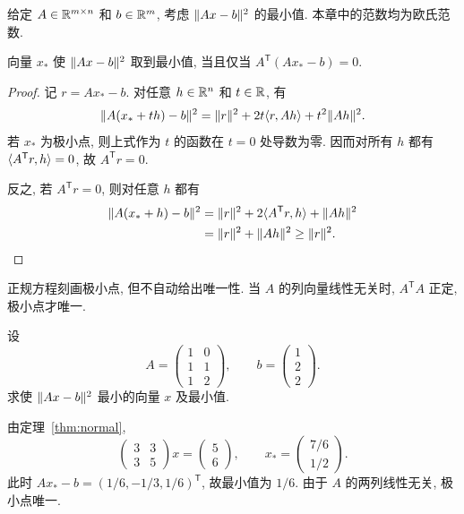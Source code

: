 给定 $A\in\mathbb R^{m\times n}$ 和 $b\in\mathbb R^m$, 考虑 $\lVert Ax-b\rVert^{2}$ 的最小值.
本章中的范数均为欧氏范数.
\begin{theorem}\label{thm:normal}
向量 $x_*$ 使 $\lVert Ax-b\rVert^{2}$ 取到最小值, 当且仅当
$A^{\mathsf T}(Ax_*-b)=0$.
\end{theorem}
\begin{proof}
记 $r=Ax_*-b$. 对任意 $h\in\mathbb R^n$ 和 $t\in\mathbb R$, 有
\[
\lVert A(x_*+th)-b\rVert^{2}
=\lVert r\rVert^{2}+2t\langle r,Ah\rangle+t^{2}\lVert Ah\rVert^{2}.
\]
若 $x_*$ 为极小点, 则上式作为 $t$ 的函数在 $t=0$ 处导数为零.
因而对所有 $h$ 都有 $\langle A^{\mathsf T}r,h\rangle=0$, 故 $A^{\mathsf T}r=0$.

反之, 若 $A^{\mathsf T}r=0$, 则对任意 $h$ 都有
\begin{align*}
\lVert A(x_*+h)-b\rVert^{2}
 &=\lVert r\rVert^{2}+2\langle A^{\mathsf T}r,h\rangle+\lVert Ah\rVert^{2}\\
 &=\lVert r\rVert^{2}+\lVert Ah\rVert^{2}\ge\lVert r\rVert^{2}.\qedhere
\end{align*}
\end{proof}
\begin{remark}
正规方程刻画极小点, 但不自动给出唯一性. 当 $A$ 的列向量线性无关时,
$A^{\mathsf T}A$ 正定, 极小点才唯一.
\end{remark}
\begin{example}
设
\[
A=\begin{pmatrix}1&0\\1&1\\1&2\end{pmatrix},\qquad
b=\begin{pmatrix}1\\2\\2\end{pmatrix}.
\]
求使 $\lVert Ax-b\rVert^{2}$ 最小的向量 $x$ 及最小值.
\end{example}
\begin{solution}
由定理~\ref{thm:normal},
\[
\begin{pmatrix}3&3\\3&5\end{pmatrix}x
=\begin{pmatrix}5\\6\end{pmatrix},\qquad
x_* =\begin{pmatrix}7/6\\1/2\end{pmatrix}.
\]
此时 $Ax_*-b=(1/6,-1/3,1/6)^{\mathsf T}$, 故最小值为 $1/6$.
由于 $A$ 的两列线性无关, 极小点唯一.
\end{solution}
